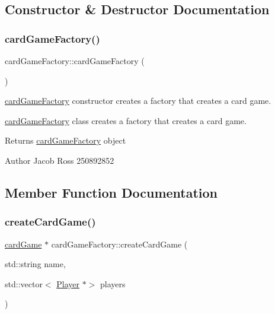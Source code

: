 \subsection{Constructor \& Destructor Documentation}
\mbox{\label{classcardGameFactory_a459f1b1dcf3366a7d8ed80fa50caf1f1}} 
\subsubsection{\texorpdfstring{card\+Game\+Factory()}{cardGameFactory()}}
{\footnotesize\ttfamily card\+Game\+Factory\+::card\+Game\+Factory (\begin{DoxyParamCaption}{ }\end{DoxyParamCaption})}



\hyperlink{classcardGameFactory}{card\+Game\+Factory} constructor creates a factory that creates a card game. 

\hyperlink{classcardGameFactory}{card\+Game\+Factory} class creates a factory that creates a card game. \begin{DoxyReturn}{Returns}
\hyperlink{classcardGameFactory}{card\+Game\+Factory} object 
\end{DoxyReturn}
\begin{DoxyAuthor}{Author}
Jacob Ross 250892852 
\end{DoxyAuthor}


\subsection{Member Function Documentation}
\mbox{\label{classcardGameFactory_a9edb0e4817b525169a6346ad687542e2}} 
\subsubsection{\texorpdfstring{create\+Card\+Game()}{createCardGame()}}
{\footnotesize\ttfamily \hyperlink{classcardGame}{card\+Game} $\ast$ card\+Game\+Factory\+::create\+Card\+Game (\begin{DoxyParamCaption}\item[{std\+::string}]{name,  }\item[{std\+::vector$<$ \hyperlink{classPlayer}{Player} $\ast$$>$}]{players }\end{DoxyParamCaption})}



